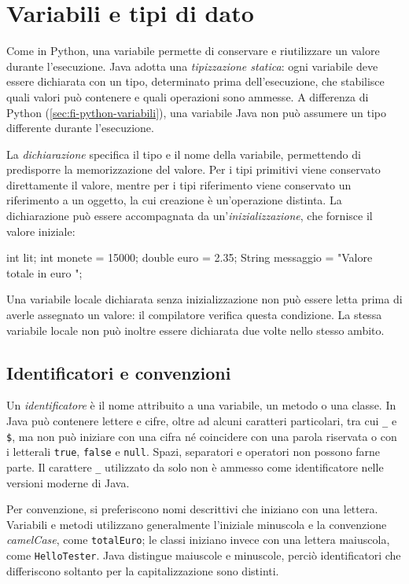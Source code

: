 \section{Variabili e tipi di dato}
\label{sec:fi-java-variabili}

Come in Python, una variabile permette di conservare e riutilizzare
un valore durante l'esecuzione. Java adotta una
\emph{tipizzazione statica}: ogni variabile deve essere dichiarata
con un tipo, determinato prima dell'esecuzione, che stabilisce
quali valori può contenere e quali operazioni sono ammesse.
A differenza di Python (\cref{sec:fi-python-variabili}),
una variabile Java non può assumere un tipo differente
durante l'esecuzione.

La \emph{dichiarazione} specifica il tipo e il nome della variabile,
permettendo di predisporre la memorizzazione del valore.
Per i tipi primitivi viene conservato direttamente il valore,
mentre per i tipi riferimento viene conservato un riferimento
a un oggetto, la cui creazione è un'operazione distinta.
La dichiarazione può essere accompagnata da
un'\emph{inizializzazione}, che fornisce il valore iniziale:

\begin{unipdcode}[language=Java]
int lit;
int monete = 15000;
double euro = 2.35;
String messaggio = "Valore totale in euro ";
\end{unipdcode}

Una variabile locale dichiarata senza inizializzazione non può
essere letta prima di averle assegnato un valore:
il compilatore verifica questa condizione. La stessa variabile
locale non può inoltre essere dichiarata due volte nello
stesso ambito.

\subsection{Identificatori e convenzioni}
\label{sec:fi-java-identificatori}

Un \emph{identificatore} è il nome attribuito a una variabile,
un metodo o una classe. In Java può contenere lettere e cifre,
oltre ad alcuni caratteri particolari, tra cui \texttt{\_}
e \texttt{\$}, ma non può iniziare con una cifra né coincidere
con una parola riservata o con i letterali
\texttt{true}, \texttt{false} e \texttt{null}.
Spazi, separatori e operatori non possono farne parte.
Il carattere \texttt{\_} utilizzato da solo non è ammesso
come identificatore nelle versioni moderne di Java.

Per convenzione, si preferiscono nomi descrittivi che iniziano
con una lettera. Variabili e metodi utilizzano generalmente
l'iniziale minuscola e la convenzione \emph{camelCase},
come \texttt{totalEuro}; le classi iniziano invece con
una lettera maiuscola, come \texttt{HelloTester}.
Java distingue maiuscole e minuscole, perciò identificatori
che differiscono soltanto per la capitalizzazione sono distinti.


